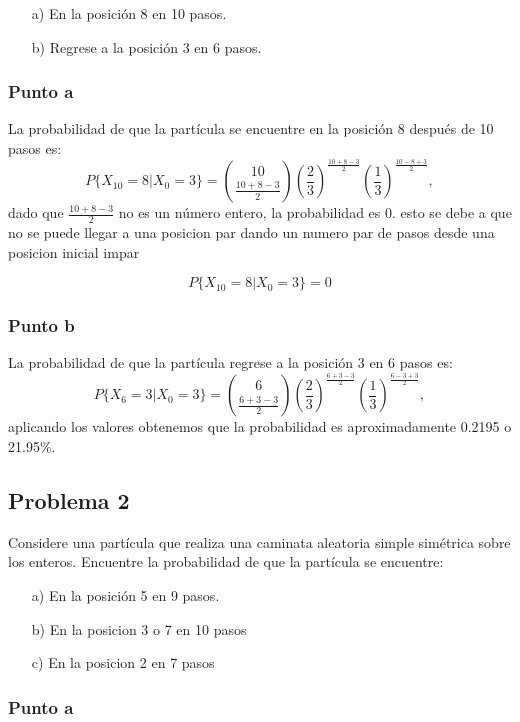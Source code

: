 \documentclass{article}
\begin{document}
\begin{enumerate}
    \item[a)] En la posición 8 en 10 pasos.
    \item[b)] Regrese a la posición 3 en 6 pasos.
\end{enumerate}

\subsubsection*{Punto a}

La probabilidad de que la partícula se encuentre en la posición 8 después de 10 pasos es:
\[
    P\{X_{10} = 8 | X_0 = 3\} = \binom{10}{\frac{10 + 8 - 3}{2}} \left(\frac{2}{3}\right)^{\frac{10 + 8 - 3}{2}} \left(\frac{1}{3}\right)^{\frac{10 - 8 + 3}{2}},
\]
dado que \( \frac{10 + 8 - 3}{2} \) no es un número entero, la probabilidad es 0. esto se debe a que no se puede llegar a una posicion par dando un numero par de pasos desde una posicion inicial impar

\[
    P\{X_{10} = 8 | X_0 = 3\} = 0
\]

\subsubsection*{Punto b}

La probabilidad de que la partícula regrese a la posición 3 en 6 pasos es:
\[
    P\{X_6 = 3 | X_0 = 3\} = \binom{6}{\frac{6 + 3 - 3}{2}} \left(\frac{2}{3}\right)^{\frac{6 + 3 - 3}{2}} \left(\frac{1}{3}\right)^{\frac{6 - 3 + 3}{2}},
\]
aplicando los valores obtenemos que la probabilidad es aproximadamente 0.2195 o 21.95\%.

\subsection*{Problema 2}

Considere una partícula que realiza una caminata aleatoria simple simétrica sobre los enteros. Encuentre la probabilidad de que la partícula se encuentre:

\begin{enumerate}
    \item[a)] En la posición 5 en 9 pasos.
    \item[b)] En la posicion 3 o 7 en 10 pasos
    \item[c)] En la posicion 2 en 7 pasos
\end{enumerate}

\subsubsection*{Punto a}
\end{document}
